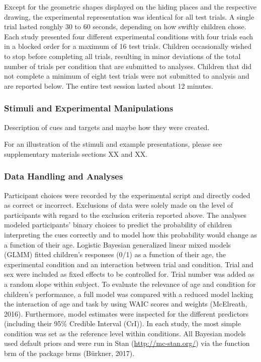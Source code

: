 \documentclass[
  man]{apa6}
\begin{document}
Except for the geometric shapes displayed on the hiding places and the respective drawing, the experimental representation was identical for all test trials. A single trial lasted roughly 30 to 60 seconds, depending on how swiftly children chose. Each study presented four different experimental conditions with four trials each in a blocked order for a maximum of 16 test trials. Children occasionally wished to stop before completing all trials, resulting in minor deviations of the total number of trials per condition that are submitted to analyses. Children that did not complete a minimum of eight test trials were not submitted to analysis and are reported below. The entire test session lasted about 12 minutes.

\subsubsection{Stimuli and Experimental Manipulations}\label{stimuli-and-experimental-manipulations}

Description of cues and targets and maybe how they were created.

For an illustration of the stimuli and example presentations, please see supplementary materials sections XX and XX.

\subsubsection{Data Handling and Analyses}\label{data-handling-and-analyses}

Participant choices were recorded by the experimental script and directly coded as correct or incorrect. Exclusions of data were solely made on the level of participants with regard to the exclusion criteria reported above. The analyses modeled participants' binary choices to predict the probability of children interpreting the cues correctly and to model how this probability would change as a function of their age. Logistic Bayesian generalized linear mixed models (GLMM) fitted children's responses (0/1) as a function of their age, the experimental condition and an interaction between trial and condition. Trial and sex were included as fixed effects to be controlled for. Trial number was added as a random slope within subject. To evaluate the relevance of age and condition for children's performance, a full model was compared with a reduced model lacking the interaction of age and task by using WAIC scores and weights (McElreath, 2016). Furthermore, model estimates were inspected for the different predictors (including their 95\% Credible Interval (CrI)). In each study, the most simple condition was set as the reference level within conditions. All Bayesian models used default priors and were run in Stan (\url{http://mc-stan.org/}) via the function brm of the package brms (Bürkner, 2017).
\end{document}

